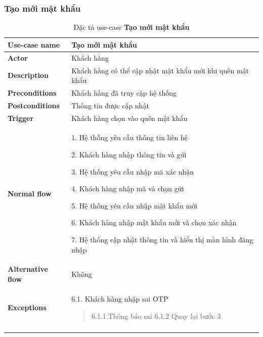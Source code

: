 \subsubsection{Tạo mới mật khẩu}
{
    \setlength\extrarowheight{6pt}
    \begin{longtable}{| p{} | p{} |}
        \hline
        \textbf{Use-case name}
         &
        Tạo mới mật khẩu
        \\
        \hline
        \textbf{Actor}
         &
        Khách hàng
        \\
        \hline
        \textbf{Description}
         &
        Khách hàng có thể cập nhật mật khẩu mới khi quên mật khẩu
        \\
        \hline
        \textbf{Preconditions}
         &
        Khách hàng đã truy cập hệ thống
        \\
        \hline
        \textbf{Postconditions}
         &
        Thông tin được cập nhật
        \\
        \hline
        \textbf{Trigger}
         &
        Khách hàng chọn vào quên mật khẩu
        \\
        \hline
        \begin{flushleft}
            \textbf{Normal flow}
        \end{flushleft}
         &
        1. Hệ thống yêu cầu thông tin liên hệ

        2. Khách hàng nhập thông tin và gửi

        3. Hệ thống yêu cầu nhập mã xác nhận

        4. Khách hàng nhập mã và chọn gửi

        5. Hệ thống yêu cầu nhập mật khẩu mới

        6. Khách hàng nhập mật khẩu mới và chọn xác nhận

        7. Hệ thống cập nhật thông tin và hiển thị màn hình đăng nhập
        \\
        \hline
        \textbf{Alternative flow}
         &
        Không
        \\
        \hline
        \textbf{Exceptions}
         &
        6.1.  Khách hàng nhập sai OTP
        \begin{quote}
            6.1.1.Thông báo sai
            6.1.2 Quay lại bước 3
        \end{quote}
        \\
        \hline
        \caption{Đặc tả use-case \textbf{Tạo mới mật khẩu}}
    \end{longtable}
}


